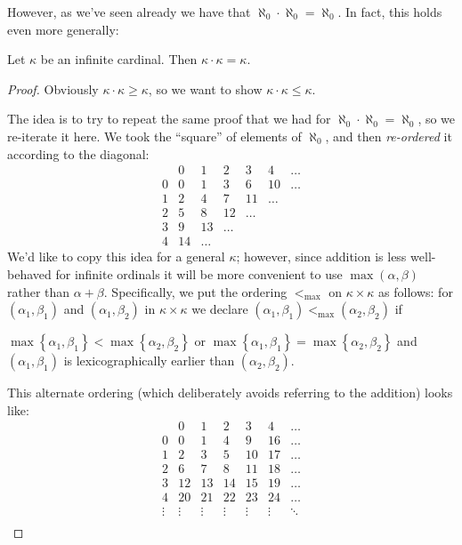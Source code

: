 However, as we've seen already we have that $\aleph_0 \cdot \aleph_0 = \aleph_0$.
In fact, this holds even more generally:

\begin{theorem}
	Let $\kappa$ be an infinite cardinal.
	Then $\kappa \cdot \kappa = \kappa$.
\end{theorem}
\begin{proof}
	Obviously $\kappa \cdot \kappa \ge \kappa$,
	so we want to show $\kappa \cdot \kappa \le \kappa$.

	The idea is to try to repeat the same proof
	that we had for $\aleph_0 \cdot \aleph_0 = \aleph_0$,
	so we re-iterate it here. We took the ``square'' of
	elements of $\aleph_0$, and then
	\emph{re-ordered} it according to the diagonal:
	\[
	\begin{array}{l|cccccc}
		  & 0 & 1 & 2 & 3 & 4 & \dots \\ \hline
		0 & 0 & 1 & 3 & 6 & 10 & \dots \\
		1 & 2 & 4 & 7 & 11 & \dots & \\
		2 & 5 & 8 & 12 & \dots & & \\
		3 & 9 & 13 & \dots & & & \\
		4 & 14 & \dots & & & &
	\end{array}
	\]
	We'd like to copy this idea for a general $\kappa$;
	however, since addition is less well-behaved for infinite ordinals
	it will be more convenient to use $\max(\alpha,\beta)$
	rather than $\alpha+\beta$.
	Specifically, we put the ordering $<_{\text{max}}$
	on $\kappa \times \kappa$ as follows:
	for $(\alpha_1, \beta_1)$ and $(\alpha_1, \beta_2)$ in $\kappa \times \kappa$
	we declare $(\alpha_1, \beta_1) <_{\text{max}} (\alpha_2, \beta_2)$ if
	\begin{itemize}
		\ii $\max \left\{ \alpha_1, \beta_1 \right\} < \max \left\{ \alpha_2, \beta_2 \right\}$ or
		\ii $\max \left\{ \alpha_1, \beta_1 \right\} = \max \left\{ \alpha_2, \beta_2 \right\}$ and $(\alpha_1, \beta_1)$
		is lexicographically earlier than $(\alpha_2, \beta_2)$.
	\end{itemize}
	This alternate ordering (which deliberately avoids referring
	to the addition) looks like:
	\[
	\begin{array}{l|cccccc}
		  & 0 & 1 & 2 & 3 & 4 & \dots \\ \hline
		0 & 0 & 1 & 4 & 9 & 16 & \dots \\
		1 & 2 & 3 & 5 & 10 & 17 & \dots \\
		2 & 6 & 7 & 8 & 11 & 18 & \dots \\
		3 & 12 & 13 & 14 & 15 & 19 & \dots \\
		4 & 20 & 21 & 22 & 23 & 24 & \dots \\
		\vdots & \vdots & \vdots & \vdots & \vdots & \vdots & \ddots \\
	\end{array}
	\]	


\end{proof}
